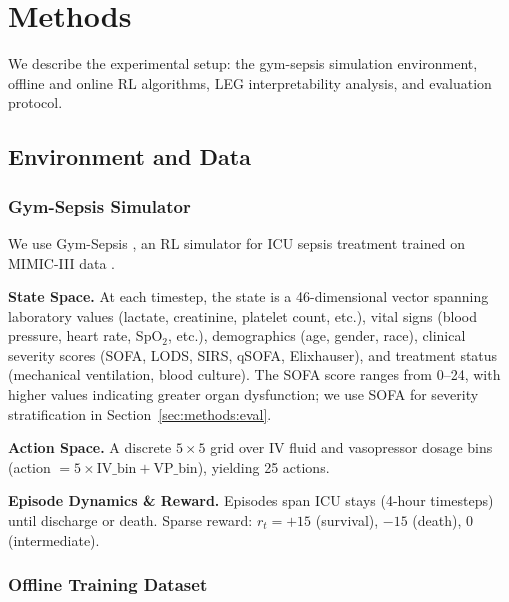 
\section{Methods}\label{sec:methods}

We describe the experimental setup: the gym-sepsis simulation environment, offline and online RL algorithms, LEG interpretability analysis, and evaluation protocol.

\subsection{Environment and Data}\label{sec:methods:env}

\subsubsection{Gym-Sepsis Simulator}

We use Gym-Sepsis \citep{raghu2017sepsis_drl}, an RL simulator for ICU sepsis treatment trained on MIMIC-III data \citep{johnson2016mimic3}.

\textbf{State Space.} At each timestep, the state is a 46-dimensional vector spanning laboratory values (lactate, creatinine, platelet count, etc.), vital signs (blood pressure, heart rate, SpO$_2$, etc.), demographics (age, gender, race), clinical severity scores (SOFA, LODS, SIRS, qSOFA, Elixhauser), and treatment status (mechanical ventilation, blood culture). The SOFA score \citep{vincent1996sofa} ranges from 0--24, with higher values indicating greater organ dysfunction; we use SOFA for severity stratification in Section~\ref{sec:methods:eval}.

\textbf{Action Space.} A discrete $5 \times 5$ grid over IV fluid and vasopressor dosage bins (action $ = 5 \times \text{IV\_bin} + \text{VP\_bin}$), yielding 25 actions.

\textbf{Episode Dynamics \& Reward.} Episodes span ICU stays (4-hour timesteps) until discharge or death. Sparse reward: $r_t = +15$ (survival), $-15$ (death), $0$ (intermediate).

\subsubsection{Offline Training Dataset}

